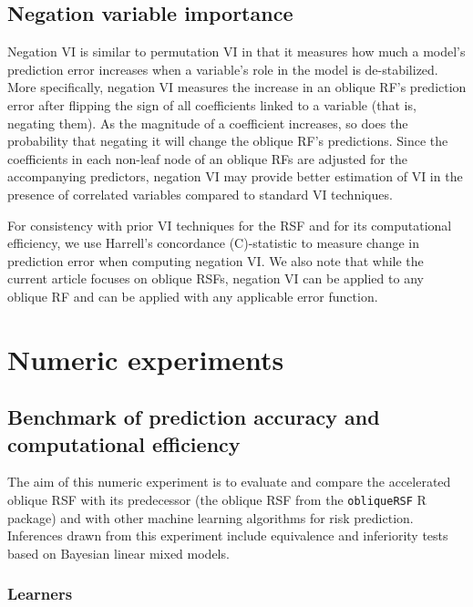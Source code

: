 \documentclass[twoside,11pt]{article}\usepackage[]{graphicx}\usepackage[]{xcolor}
\newcommand{\ie}{that is}
\begin{document}
\subsection{Negation variable importance}

Negation VI is similar to permutation VI in that it measures how much a model’s prediction error increases when a variable’s role in the model is de-stabilized. More specifically, negation VI measures the increase in an oblique RF's prediction error after flipping the sign of all coefficients linked to a variable (\ie, negating them). As the magnitude of a coefficient increases, so does the probability that negating it will change the oblique RF's predictions. Since the coefficients in each non-leaf node of an oblique RFs are adjusted for the accompanying predictors, negation VI may provide better estimation of VI in the presence of correlated variables compared to standard VI techniques.

For consistency with prior VI techniques for the RSF and for its computational efficiency, we use Harrell's concordance (C)-statistic \citep{harrell1982evaluating} to measure change in prediction error when computing negation VI. We also note that while the current article focuses on oblique RSFs, negation VI can be applied to any oblique RF and can be applied with any applicable error function.

\section{Numeric experiments}

\subsection{Benchmark of prediction accuracy and computational efficiency} \label{sec:bm_pred}

The aim of this numeric experiment is to evaluate and compare the accelerated oblique RSF with its predecessor (the oblique RSF from the \texttt{obliqueRSF} R package) and with other machine learning algorithms for risk prediction. Inferences drawn from this experiment include equivalence and inferiority tests based on Bayesian linear mixed models.

\subsubsection{Learners} \label{sec:learners}
\end{document}
